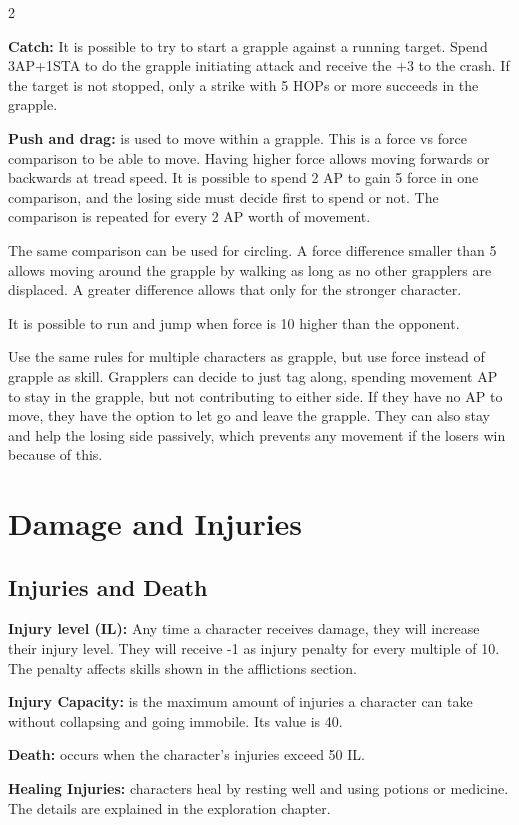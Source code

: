 \begin{multicols}{2}
{\textbf{Catch:} It is possible to try to start a grapple against a running target. Spend 3AP+1STA to do the grapple initiating attack and receive the +3 to the crash. If the target is not stopped, only a strike with 5 HOPs or more succeeds in the grapple.


\textbf{Push and drag:} is used to move within a grapple. This is a force vs force comparison to be able to move. Having higher force allows moving forwards or backwards at tread speed. It is possible to spend 2 AP to gain 5 force in one comparison, and the losing side must decide first to spend or not. The comparison is repeated for every 2 AP worth of movement.

The same comparison can be used for circling. A force difference smaller than 5 allows moving around the grapple by walking as long as no other grapplers are displaced. A greater difference allows that only for the stronger character.

It is possible to run and jump when force is 10 higher than the opponent. 

Use the same rules for multiple characters as grapple, but use force instead of grapple as skill. Grapplers can decide to just tag along, spending movement AP to stay in the grapple, but not contributing to either side. If they have no AP to move, they have the option to let go and leave the grapple. They can also stay and help the losing side passively, which prevents any movement if the losers win because of this.
}


\section{Damage and Injuries}

\subsection{Injuries and Death}

\textbf{Injury level (IL):} Any time a character receives damage, they will increase their injury level. They will receive -1 as injury penalty for every multiple of 10. The penalty affects skills shown in the afflictions section.

\textbf{Injury Capacity:} is the maximum amount of injuries a character can take without collapsing and going immobile. Its value is 40.

\textbf{Death:} occurs when the character's injuries exceed 50 IL.

\textbf{Healing Injuries:} characters heal by resting well and using potions or medicine. The details are explained in the exploration chapter.


\end{multicols}

